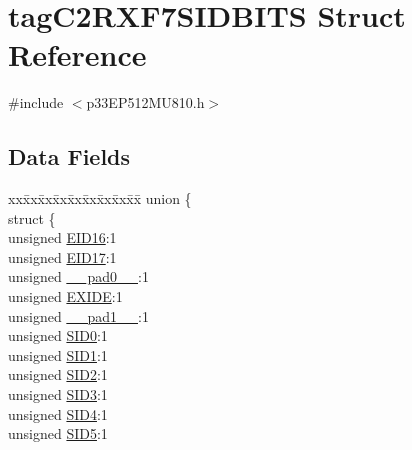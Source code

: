 \hypertarget{structtag_c2_r_x_f7_s_i_d_b_i_t_s}{}\section{tag\+C2\+R\+X\+F7\+S\+I\+D\+B\+I\+TS Struct Reference}
\label{structtag_c2_r_x_f7_s_i_d_b_i_t_s}


{\ttfamily \#include $<$p33\+E\+P512\+M\+U810.\+h$>$}

\subsection*{Data Fields}
\begin{DoxyCompactItemize}
\item 
\begin{tabbing}
xx\=xx\=xx\=xx\=xx\=xx\=xx\=xx\=xx\=\kill
union \{\\
\>struct \{\\
\>\>unsigned \hyperlink{structtag_c2_r_x_f7_s_i_d_b_i_t_s_a6dd5663b0c9838c56db040560ca0efa1}{EID16}:1\\
\>\>unsigned \hyperlink{structtag_c2_r_x_f7_s_i_d_b_i_t_s_aa648615464b0eb29967529333eee9fd9}{EID17}:1\\
\>\>unsigned \hyperlink{structtag_c2_r_x_f7_s_i_d_b_i_t_s_adf71f3d8410c1f1dbbc96680a92c49af}{\_\_pad0\_\_}:1\\
\>\>unsigned \hyperlink{structtag_c2_r_x_f7_s_i_d_b_i_t_s_a09ff1c1be3927220bd3dfbc10edfe243}{EXIDE}:1\\
\>\>unsigned \hyperlink{structtag_c2_r_x_f7_s_i_d_b_i_t_s_acaf2d0924a107ec6e8d2e31febaf66f9}{\_\_pad1\_\_}:1\\
\>\>unsigned \hyperlink{structtag_c2_r_x_f7_s_i_d_b_i_t_s_a1ca276ac15df60e1f7b9a6d0011ade93}{SID0}:1\\
\>\>unsigned \hyperlink{structtag_c2_r_x_f7_s_i_d_b_i_t_s_a3405d354f81391f879648f69f504dfc8}{SID1}:1\\
\>\>unsigned \hyperlink{structtag_c2_r_x_f7_s_i_d_b_i_t_s_ad744966dfc49307f731b7045b01b94e5}{SID2}:1\\
\>\>unsigned \hyperlink{structtag_c2_r_x_f7_s_i_d_b_i_t_s_a9345f3e64720be93e83d8dfc827f3f45}{SID3}:1\\
\>\>unsigned \hyperlink{structtag_c2_r_x_f7_s_i_d_b_i_t_s_aefb106fed4bb40e2c3c71ac612c554e3}{SID4}:1\\
\>\>unsigned \hyperlink{structtag_c2_r_x_f7_s_i_d_b_i_t_s_a0f221b3c9612231686bf87ccdcec8489}{SID5}:1\\

\end{tabbing}
\end{DoxyCompactItemize}
